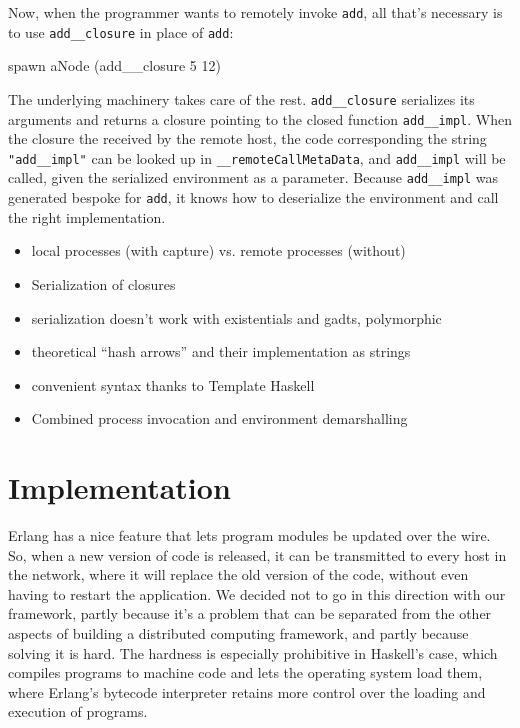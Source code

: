 \documentclass[preprint]{sigplanconf}
\begin{document}
Now, when the programmer wants to remotely invoke \texttt{add}, all that's necessary is to use \texttt{add\_\_closure} in place of \texttt{add}:

\begin{code}
spawn aNode (add__closure 5 12)
\end{code}

The underlying machinery takes care of the rest. \texttt{add\_\_closure} serializes its arguments and returns a closure pointing to the closed function \texttt{add\_\_impl}. When the closure the received by the remote host, the code corresponding the string \texttt{"add\_\_impl"} can be looked up in \texttt{\_\_remoteCallMetaData}, and \texttt{add\_\_impl} will be called, given the serialized environment as a parameter. Because \texttt{add\_\_impl} was generated bespoke for \texttt{add}, it knows how to deserialize the environment and call the right implementation.

\begin{itemize}
\item local processes (with capture) vs. remote processes (without)
\item Serialization of closures
\item serialization doesn't work with existentials and gadts, polymorphic
\item theoretical ``hash arrows'' and their implementation as strings
\item convenient syntax thanks to Template Haskell
\item Combined process invocation and environment demarshalling
\end{itemize}


\section{Implementation}
Erlang has a nice feature that lets program modules be updated over the wire. So, when a new version of code is released, it can be transmitted to every host in the network, where it will replace the old version of the code, without even having to restart the application. We decided not to go in this direction with our framework, partly because it's a problem that can be separated from the other aspects of building a distributed computing framework, and partly because solving it is hard. The hardness is especially prohibitive in Haskell's case, which compiles programs to machine code and lets the operating system load them, where Erlang's bytecode interpreter retains more control over the loading and execution of programs.
\end{document}
